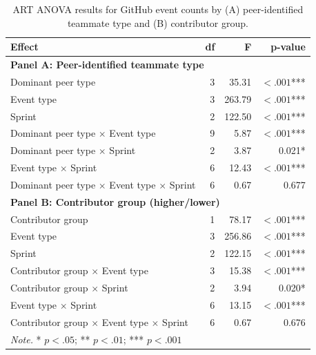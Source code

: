 \begin{table}[ht]
\centering
\footnotesize
\caption{ART ANOVA results for GitHub event counts by (A) peer-identified teammate type and (B) contributor group.}
\label{tab:gh-anova-combined}
\begin{tabular}{l r r r}
\toprule
\textbf{Effect} & \textbf{df} & \textbf{F} & \textbf{p-value} \\
\midrule
\multicolumn{4}{l}{\textbf{Panel A: Peer-identified teammate type}} \\
\midrule
Dominant peer type & 3 & 35.31 & $< .001$*** \\
Event type & 3 & 263.79 & $< .001$*** \\
Sprint & 2 & 122.50 & $< .001$*** \\
Dominant peer type $\times$ Event type & 9 & 5.87 & $< .001$*** \\
Dominant peer type $\times$ Sprint & 2 & 3.87 & 0.021* \\
Event type $\times$ Sprint & 6 & 12.43 & $< .001$*** \\
Dominant peer type $\times$ Event type $\times$ Sprint & 6 & 0.67 & 0.677 \\
\midrule
\multicolumn{4}{l}{\textbf{Panel B: Contributor group (higher/lower)}} \\
\midrule
Contributor group & 1 & 78.17 & $< .001$*** \\
Event type & 3 & 256.86 & $< .001$*** \\
Sprint & 2 & 122.15 & $< .001$*** \\
Contributor group $\times$ Event type & 3 & 15.38 & $< .001$*** \\
Contributor group $\times$ Sprint & 2 & 3.94 & 0.020* \\
Event type $\times$ Sprint & 6 & 13.15 & $< .001$*** \\
Contributor group $\times$ Event type $\times$ Sprint & 6 & 0.67 & 0.676 \\
\midrule
\multicolumn{4}{l}{\textit{Note.} * $p < .05$; ** $p < .01$; *** $p < .001$} \\
\bottomrule
\end{tabular}
\end{table}
